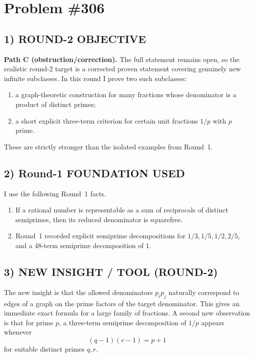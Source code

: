 \section*{Problem \#306}

\subsection*{1) ROUND-2 OBJECTIVE}
\textbf{Path C (obstruction/correction).}
The full statement remains open, so the realistic round-2 target is a corrected proven statement covering genuinely new infinite subclasses.
In this round I prove two such subclasses:
\begin{enumerate}
\item a graph-theoretic construction for many fractions whose denominator is a product of distinct primes;
\item a short explicit three-term criterion for certain unit fractions \(1/p\) with \(p\) prime.
\end{enumerate}
These are strictly stronger than the isolated examples from Round~1.

\subsection*{2) Round-1 FOUNDATION USED}
I use the following Round~1 facts.
\begin{enumerate}
\item If a rational number is representable as a sum of reciprocals of distinct semiprimes, then its reduced denominator is squarefree.
\item Round~1 recorded explicit semiprime decompositions for \(1/3,1/5,1/2,2/5\), and a 48-term semiprime decomposition of \(1\).
\end{enumerate}

\subsection*{3) NEW INSIGHT / TOOL (ROUND-2)}
The new insight is that the allowed denominators \(p_i p_j\) naturally correspond to edges of a graph on the prime factors of the target denominator.
This gives an immediate exact formula for a large family of fractions.
A second new observation is that for prime \(p\), a three-term semiprime decomposition of \(1/p\) appears whenever
\[
  (q-1)(r-1)=p+1
\]
for suitable distinct primes \(q,r\).

